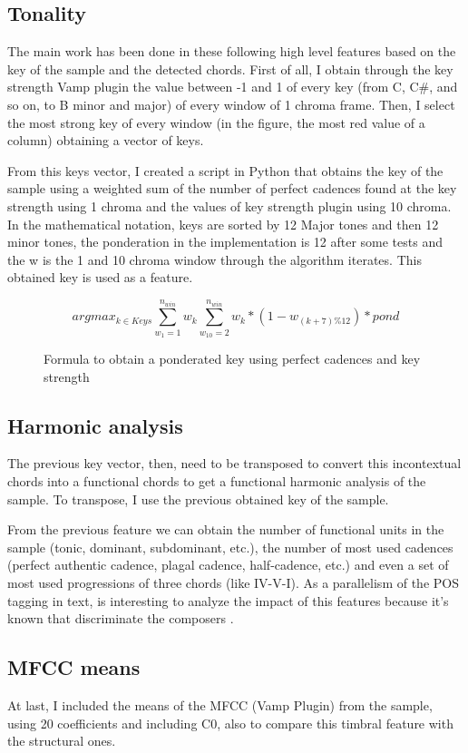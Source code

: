 \documentclass{article}
\begin{document}
\subsection{Tonality}\label{subsec:chord_windows}
The main work has been done in these following high level features based on the key of the sample and the detected chords. First of all, I obtain through the key strength Vamp plugin the value between -1 and 1 of every key (from C, C\#, and so on, to B minor and major) of every window of 1 chroma frame. Then, I select the most strong key of every window (in the figure, the most red value of a column) obtaining a vector of keys.

From this keys vector, I created a script in Python that obtains the key of the sample using a weighted sum of the number of perfect cadences found at the key strength using 1 chroma and the values of key strength plugin using 10 chroma. In the mathematical notation, keys are sorted by 12 Major tones and then 12 minor tones, the ponderation in the implementation is 12 after some tests and the w is the 1 and 10 chroma window through the algorithm iterates. This obtained key is used as a feature.

\begin{figure}
\[ argmax_{k \in Keys} \sum_{w_{1}=1}^{n_{win}} w_k \sum_{w_{10}=2}^{n_{win}} w_k * (1-w_{(k+7)\%12})*pond \]
\caption{Formula to obtain a ponderated key using perfect cadences and key strength} \label{fig:keyFormula}
\end{figure}


\subsection{Harmonic analysis}\label{subsec:uni_bi_tri}
The previous key vector, then, need to be transposed to convert this incontextual chords into a functional chords to get a functional harmonic analysis of the sample. To transpose, I use the previous obtained key of the sample.

From the previous feature we can obtain the number of functional units in the sample (tonic, dominant, subdominant, etc.), the number of most used cadences (perfect authentic cadence, plagal cadence, half-cadence, etc.) and even a set of most used progressions of three chords (like IV-V-I). As a parallelism of the POS tagging in text, is interesting to analyze the impact of this features because it's known that discriminate the composers \cite{desportes}.

\subsection{MFCC means}\label{subsec:mfcc_means}
At last, I included the means of the MFCC (Vamp Plugin) from the sample, using 20 coefficients and including C0, also to compare this timbral feature with the structural ones.
\end{document}
